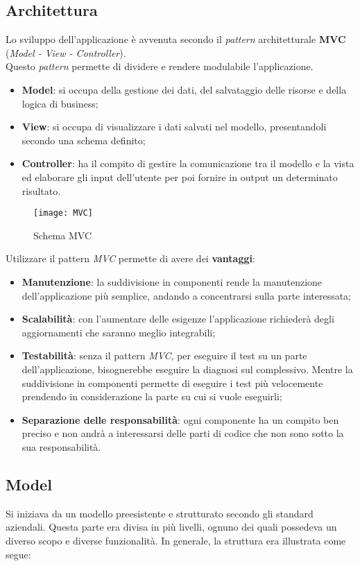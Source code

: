 \newpage
\subsection{Architettura}
Lo sviluppo dell'applicazione è avvenuta secondo il \textit{pattern} architetturale \textbf{MVC \glsfirstoccur} (\textit{Model - View - Controller}). \\
Questo \textit{pattern} permette di dividere e rendere modulabile l'applicazione.
\begin{itemize}
\item \textbf{Model}: si occupa della gestione dei dati, del salvataggio delle risorse e della logica di business;
\item \textbf{View}: si occupa di visualizzare i dati salvati nel modello, presentandoli secondo una schema definito;
\item \textbf{Controller}: ha il compito di gestire la comunicazione tra il modello e la vista ed elaborare gli input dell'utente per poi fornire in output un determinato risultato.
\end{itemize}

\begin{figure}[H]
    \centering 
    \texttt{[image: MVC]} 
    \bigskip
    \caption{Schema MVC}
\end{figure}

\noindent
Utilizzare il pattern \textit{MVC} permette di avere dei \textbf{vantaggi}:
\begin{itemize}
\item \textbf{Manutenzione}: la suddivisione in componenti rende la manutenzione dell'applicazione più semplice, andando a concentrarsi sulla parte interessata;
\item \textbf{Scalabilità}: con l'aumentare delle esigenze l'applicazione richiederà degli aggiornamenti che saranno meglio integrabili;
\item \textbf{Testabilità}: senza il pattern \textit{MVC}, per eseguire il test su un parte dell'applicazione, bisognerebbe eseguire la diagnosi sul complessivo. Mentre la suddivisione in componenti permette di eseguire i test più velocemente prendendo in considerazione la parte su cui si vuole eseguirli;
\item \textbf{Separazione delle responsabilità}: ogni componente ha un compito ben preciso e non andrà a interessarsi delle parti di codice che non sono sotto la sua responsabilità.
\end{itemize}

\subsection*{Model}
Si iniziava da un modello preesistente e strutturato secondo gli standard aziendali. Questa parte era divisa in più livelli, ognuno dei quali possedeva un diverso scopo e diverse funzionalità. In generale, la struttura era illustrata come segue: 

